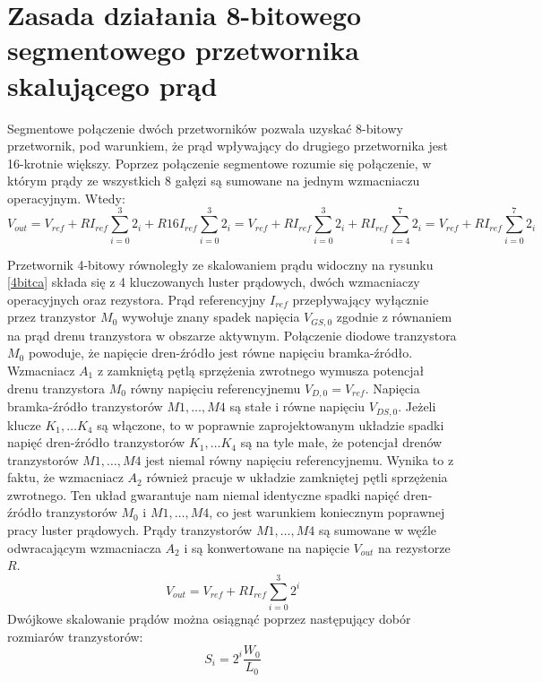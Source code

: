 \documentclass[10pt,a4paper,twoside]{report}
\theoremstyle{definition}
\theoremstyle{definition}
\theoremstyle{definition}
\theoremstyle{definition}
\theoremstyle{definition}
\begin{document}
{	\section{Zasada działania 8-bitowego segmentowego przetwornika skalującego prąd}
{ Segmentowe połączenie dwóch przetworników pozwala uzyskać 8-bitowy przetwornik, pod warunkiem, że prąd wpływający do drugiego przetwornika jest 16-krotnie większy. Poprzez połączenie segmentowe rozumie się połączenie, w którym prądy ze wszystkich 8 gałęzi są sumowane na jednym wzmacniaczu operacyjnym. Wtedy:
	\begin{equation}
	V_{out} = V_{ref} + R I_{ref} \sum_{i=0}^{3} 2_i + R 16 I_{ref} \sum_{i=0}^{3} 2_i
	= V_{ref} + R I_{ref} \sum_{i=0}^{3} 2_i + R I_{ref} \sum_{i=4}^{7} 2_i
	= V_{ref} + R I_{ref} \sum_{i=0}^{7} 2_i
	\end{equation}
}

{	Przetwornik 4-bitowy równoległy ze skalowaniem prądu widoczny na rysunku \ref{4bitca} składa się z 4 kluczowanych luster prądowych, dwóch wzmacniaczy operacyjnych oraz rezystora. Prąd referencyjny $I_{ref}$ przepływający wyłącznie przez tranzystor $M_0$ wywołuje znany spadek napięcia $V_{GS,0}$ zgodnie z równaniem na prąd drenu tranzystora w obszarze aktywnym. Połączenie diodowe tranzystora $M_0$ powoduje, że napięcie dren-źródło jest równe napięciu bramka-źródło. Wzmacniacz $A_1$ z zamkniętą pętlą sprzężenia zwrotnego wymusza potencjał drenu tranzystora $M_0$ równy napięciu referencyjnemu $V_{D,0} = V_{ref}$. Napięcia bramka-źródło tranzystorów $M1,\dots, M4$ są stałe i równe napięciu $V_{DS,0}$. Jeżeli klucze $K_1, \dots K_4$ są włączone, to w poprawnie zaprojektowanym układzie spadki napięć dren-źródło tranzystorów $K_1, \dots K_4$ są na tyle małe, że potencjał drenów tranzystorów $M1,\dots, M4$ jest niemal równy napięciu referencyjnemu. Wynika to z faktu, że wzmacniacz $A_2$ również pracuje w układzie zamkniętej pętli sprzężenia zwrotnego. Ten układ gwarantuje nam niemal identyczne spadki napięć dren-źródło tranzystorów $M_0$ i $M1,\dots, M4$, co jest warunkiem koniecznym poprawnej pracy luster prądowych. Prądy tranzystorów $M1,\dots, M4$ są sumowane w węźle odwracającym wzmacniacza $A_2$ i są konwertowane na napięcie $V_{out}$ na rezystorze $R$.}
\begin{equation}
V_{out} = V_{ref} + R I_{ref} \sum_{i=0}^{3} 2^i 
\end{equation}
{	Dwójkowe skalowanie prądów można osiągnąć poprzez następujący dobór rozmiarów tranzystorów:}
\begin{equation}
S_i = 2^i \frac{W_0}{L_0}
\end{equation}

}
\end{document}
